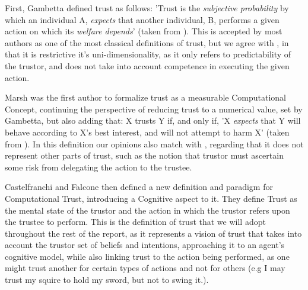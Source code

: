 \begin{itemize}
	\tallitem First, Gambetta\cite{Gambetta1988} defined trust as follows: 'Trust is the \textit{subjective probability} by which an individual A, \textit{expects} that another individual, B, performs a given action on which its \textit{welfare depends}' (taken from \cite{Castelfranchi2010}). This is accepted by most authors as one of the most classical definitions of trust, but we agree with \cite{Castelfranchi2010}, in that it is restrictive it's uni-dimensionality, as it only refers to predictability of the trustor, and does not take into account competence in executing the given action.
	
	\tallitem Marsh\cite{Marsh1994} was the first author to formalize trust as a measurable Computational Concept, continuing the perspective of reducing trust to a numerical value, set by Gambetta\cite{Gambetta1988}, but also adding that: X trusts Y if, and only if, 'X \textit{expects} that Y will behave according to X's best interest, and will not attempt to harm X' (taken from \cite{Castelfranchi2010}). In this definition our opinions also match with \cite{Castelfranchi2010}, regarding that it does not represent other parts of trust, such as the notion that trustor must ascertain some risk from delegating the action to the trustee.
	
	\tallitem Castelfranchi and Falcone then defined a new definition and paradigm for Computational Trust, introducing a Cognitive aspect to it\cite{Castelfranchi1998}. They define Trust as the mental state of the trustor and the action in which the trustor refers upon the trustee to perform. This is the definition of trust that we will adopt throughout the rest of the report, as it represents a vision of trust that takes into account the trustor set of beliefs and intentions, approaching it to an agent's cognitive model, while also linking trust to the action being performed, as one might trust another for certain types of actions and not for others (e.g I may trust my squire to hold my sword, but not to swing it.).
\end{itemize}

